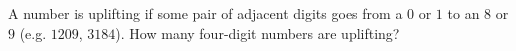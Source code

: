 A number is uplifting if some pair of adjacent digits goes from a $0$ or $1$ to an $8$ or $9$ (e.g. $1209$, $3184$). How many four-digit numbers are uplifting?
